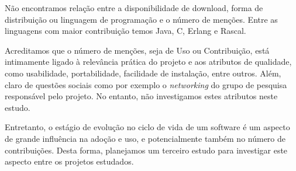 Não encontramos relação entre a disponibilidade de download, forma de
distribuição ou linguagem de programação e o número de menções. Entre as
linguagens com maior contribuição temos Java, C, Erlang e Rascal.

Acreditamos que o número de menções, seja de Uso ou Contribuição, está
intimamente ligado à relevância prática do projeto e aos atributos de
qualidade, como usabilidade, portabilidade, facilidade de instalação, entre
outros. Além, claro de questões sociais como por exemplo o {\it networking} do grupo
de pesquisa responsável pelo projeto. No entanto, não investigamos estes atributos neste estudo.

Entretanto, o estágio de evolução no ciclo de vida de um software é um aspecto
de grande influência na adoção e uso, e potencialmente também no
número de contribuições. Desta forma, planejamos um terceiro estudo para
investigar este aspecto entre os projetos estudados.

